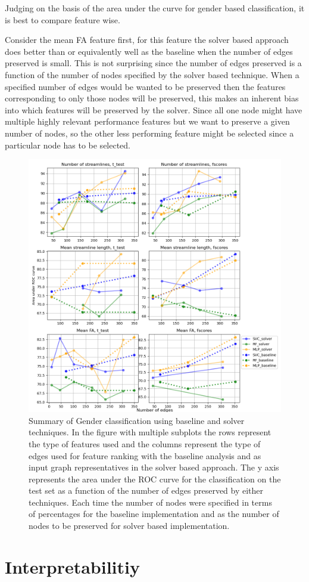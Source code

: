 \documentclass[msthesis.tex]{subfiles}
\begin{document}
Judging on the basis of the area under the curve for gender based classification, it is best to compare feature wise.

Consider the mean FA feature first, for this feature the solver based approach does better than or equivalently well as the baseline when the number of edges preserved is small. This is not surprising since the number of edges preserved is a function of the number of nodes specified by the solver based technique. When a specified number of edges would be wanted to be preserved then the features corresponding to only those nodes will be preserved, this makes an inherent bias into which features will be preserved by the solver. Since all one node might have multiple highly relevant performance features but we want to preserve a given number of nodes, so the other less performing feature might be selected since a particular node has to be selected.


\begin{figure}
    \centering
    \includegraphics[width=\textwidth]{images/combined_clf_auc_gender.png}
    \caption{ Summary of Gender classification using baseline and solver techniques. In the figure with multiple subplots the rows represent the type of features used and the columns represent the type of edges used for feature ranking with the baseline analysis and as input graph representatives in the solver based approach. The y axis represents the area under the ROC curve for the classification on the test set as a function of the number of edges preserved by either techniques. Each time the number of nodes were specified in terms of percentages for the baseline implementation and as the number of nodes to be preserved for solver based implementation.}
    \label{fig:my_label}
\end{figure}

\section{Interpretabilitiy}
\end{document}
